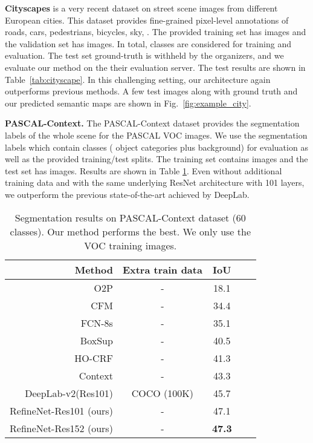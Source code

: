 \documentclass[10pt,twocolumn,letterpaper]{article}
\def\best{\bf \cellcolor[gray]{0.85}}
\def\secbest{\cellcolor[gray]{0.92} }
\newcommand{\myparagraph}[1]{\vspace{.5em}\noindent\textbf{#1}}
\begin{document}
\myparagraph{Cityscapes}
\cite{Cordts2016Cityscapes} is a very recent dataset on street scene images from  different European cities.
This dataset provides fine-grained pixel-level annotations of roads, cars, pedestrians, bicycles, sky, \etc.
The provided training set has  images and the validation set has  images.
In total,  classes are considered for training and evaluation.
The test set ground-truth is withheld by the organizers, and we evaluate our method on the their evaluation server.
The test results are shown in Table~\ref{tab:cityscape}.
In this challenging setting, our architecture again outperforms previous methods.
A few test images along with ground truth and our predicted semantic maps are shown in Fig.~\ref{fig:example_city}.





\myparagraph{PASCAL-Context.}
The PASCAL-Context \cite{mottaghi2014role} dataset provides the segmentation labels of the whole scene for the PASCAL VOC images.
We use the segmentation labels which contain  classes ( object categories plus background) for evaluation as well as the provided training/test splits. The training set contains  images and the test set has  images.
Results are shown in Table \ref{tab:pascalcontext}. Even without additional training data and with the same underlying ResNet architecture with 101 layers, we outperform the previous state-of-the-art achieved by DeepLab. 


\begin{table}[t]
\caption{Segmentation results on PASCAL-Context dataset (60 classes).
Our method performs the best. We only use the VOC training images. }
\centering
\resizebox{.75\linewidth}{!}
  {
  \begin{tabular}{ r | c c c c} 
  Method	& Extra train data 	&IoU\\ \hline \hline
O2P \cite{carreira2012semantic} &- 	&18.1\\
CFM \cite{dai2014convolutional} &-	&34.4\\
FCN-8s \cite{LongSD14} &- 	&35.1\\
BoxSup \cite{Dai2015arXiv} &-	&40.5\\ 
HO-CRF \cite{arnab2016higher} &- &41.3\\ 
Context \cite{lin2016piece} &-	& 43.3\\ 
DeepLab-v2(Res101) \cite{ChenPK0Y16} & COCO (100K) & 45.7 \\ \hline \hline
RefineNet-Res101 (ours) &- & \secbest 47.1 \\
RefineNet-Res152 (ours) &- & \best 47.3\\
 \end{tabular}
  }
\label{tab:pascalcontext}
\end{table}
\end{document}
